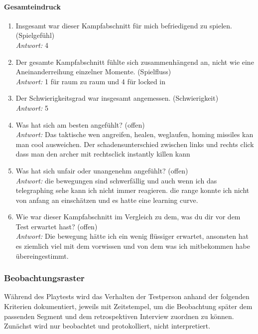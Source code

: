 \documentclass[../Main.tex]{subfiles}
\begin{document}
\paragraph{Gesamteindruck}
\begin{enumerate}[label=\textbf{Q\arabic*}, leftmargin=1.5cm, itemsep=0.8em, resume]
\item Insgesamt war dieser Kampfabschnitt für mich befriedigend zu spielen. \hfill (Spielgefühl) \\
    \textit{Antwort:} 4
\item Der gesamte Kampfabschnitt fühlte sich zusammenhängend an, nicht wie eine Aneinanderreihung einzelner Momente. \hfill (Spielfluss) \\
    \textit{Antwort:} 1 für raum zu raum und 4 für locked in
\item Der Schwierigkeitsgrad war insgesamt angemessen. \hfill (Schwierigkeit) \\
    \textit{Antwort:} 5
\item Was hat sich am besten angefühlt? \hfill (offen) \\
    \textit{Antwort:} Das taktische wen angreifen, healen, weglaufen, homing missiles kan man cool ausweichen. Der schadensunterschied zwischen links und rechts click dass man den archer mit rechtsclick instantly killen kann
\item Was hat sich unfair oder unangenehm angefühlt? \hfill (offen) \\
    \textit{Antwort:} die bewegungen sind schwerfällig und auch wenn ich das telegraphing sehe kann ich nicht immer reagieren. die range konnte ich nicht von anfang an einschätzen und es hatte eine learning curve.
\item Wie war dieser Kampfabschnitt im Vergleich zu dem, was du dir vor dem Test erwartet hast? \hfill (offen) \\
    \textit{Antwort:} Die bewegung hätte ich ein wenig flüssiger erwartet, ansonsten hat es ziemlich viel mit dem vorwissen und von dem was ich mitbekommen habe übereingestimmt.
\end{enumerate}

\subsubsection{Beobachtungsraster}

Während des Playtests wird das Verhalten der Testperson anhand der folgenden Kriterien dokumentiert, jeweils mit Zeitstempel, um die Beobachtung später dem passenden Segment und dem retrospektiven Interview zuordnen zu können. Zunächst wird nur beobachtet und protokolliert, nicht interpretiert.
\end{document}
